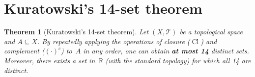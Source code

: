 \documentclass[11pt,a4paper,twoside]{book}
\newtheorem{theorem}{Theorem}[section]
\theoremstyle{remark}
\theoremstyle{definition}
\theoremstyle{definition}
\newcommand{\Tau}{\mathcal{T}}           %
\newcommand{\R}{\mathbb{R}}
\DeclareMathOperator{\Cl}{Cl}
\begin{document}
\section{Kuratowski's 14-set theorem}
\label{sec:kuratowski-14}

\begin{theorem}[Kuratowski's 14-set theorem]
\label{thm:kuratowski-14}
Let $(X,\Tau)$ be a topological space and $A\subseteq X$.  By repeatedly
applying the operations of closure ($\Cl$) and complement ($(\cdot)^c$) to~$A$
in any order, one can obtain \textbf{at most 14} distinct sets.  Moreover,
there exists a set in~$\R$ (with the standard topology) for which all 14 are
distinct.
\end{theorem}
\end{document}
